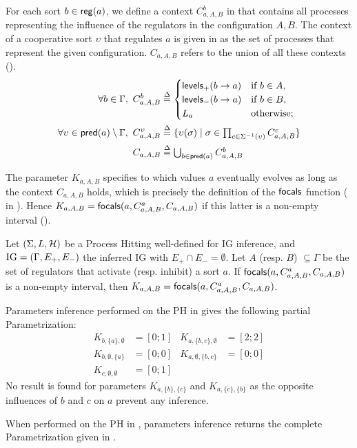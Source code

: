 For each sort $b \in \mathsf{reg}({a})$, we define a context $C^b_{a,A,B}$ in  that contains all processes representing the influence of the regulators in the configuration $A,B$.
The context of a cooperative sort $\upsilon$ that regulates $a$ is given in  as the set of processes that represent the given configuration.
$C_{a,A,B}$ refers to the union of all these contexts ().
\begin{align}
\label{eq:param_context}
\forall b\in\Gamma,~
C_{a,A,B}^b & \stackrel{\Delta}= \begin{cases}
\mathsf{levels}_+(b\rightarrow a) & \text{if $b \in A$,}\\
\mathsf{levels}_-(b\rightarrow a) & \text{if $b \in B$,}\\
L_a		& \text{otherwise;}\\
\end{cases}
\\
\label{eq:param_context_coop}
\forall \upsilon \in \mathsf{pred}(a)\setminus\Gamma,~
C_{a,A,B}^\upsilon & \stackrel{\Delta}= \{
\upsilon(\sigma) \mid \sigma \in \textstyle\prod_{c\in\Sigma^{-1}(\upsilon)}C_{a,A,B}^c \}
\\
C_{a,A,B} & \stackrel{\Delta}= \textstyle\bigcup_{b\in\mathsf{pred}(a)} C^b_{a,A,B}
\label{eq:K-ctx}
\end{align}

The parameter $K_{a,A,B}$ specifies to which values $a$ eventually evolves as long as the context
$C_{a,A,B}$ holds, which is precisely the definition of the $\mathsf{focals}$ function
( in ).
Hence $K_{a,A,B} = \mathsf{focals}(a,C^a_{a,A,B},C_{a,A,B})$ if this latter is a non-empty interval
().

\begin{definition}
\label{def:param_K}
Let $(\Sigma, L, \mathcal{H})$ be a Process Hitting well-defined for IG inference, and $\mathrm{IG} = (\Gamma,
E_+, E_-)$ the inferred IG with $E_+\cap E_-=\emptyset$.
Let $A$ (resp. $B$) $\subseteq \Gamma$ be the set of regulators that activate (resp. inhibit) a sort
$a$.
If $\mathsf{focals}(a,C^a_{a,A,B},C_{a,A,B})$ is a non-empty interval, 
	then $K_{a,A,B} = \mathsf{focals}(a, C^a_{a,A,B}, C_{a,A,B})$.
\end{definition}

\begin{example*}
Parameters inference performed on the PH in  gives the following partial Parametrization:
\begin{align*}
K_{b,\{a\},\emptyset} &= [0 ; 1] & K_{a,\{b,c\},\emptyset} &= [2 ; 2] \\
K_{b,\emptyset,\{a\}} &= [0 ; 0] & K_{a,\emptyset,\{b,c\}} &= [0 ; 0] \\
K_{c,\emptyset,\emptyset} &= [0 ; 1]
\end{align*}
No result is found for parameters $K_{a,\{b\},\{c\}}$ and $K_{a,\{c\},\{b\}}$ as the opposite influences of $b$ and $c$ on $a$ prevent any inference.

When performed on the PH in , parameters inference returns the complete Parametrization given in .
\end{example*}


